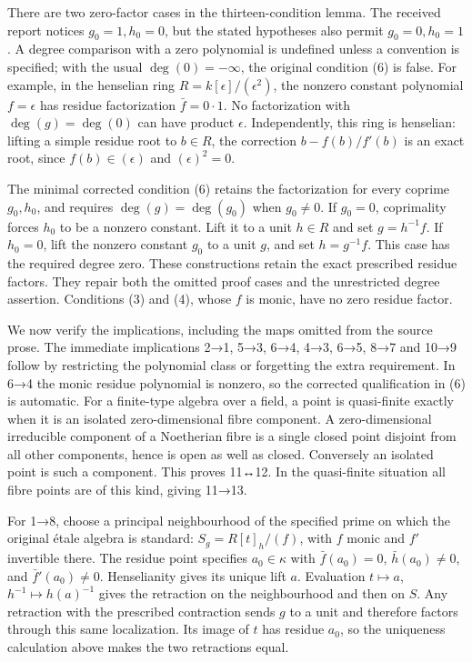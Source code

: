 There are two zero-factor cases in the thirteen-condition lemma. The received report notices \(g_0=1,h_0=0\), but the stated hypotheses also permit \(g_0=0,h_0=1\). A degree comparison with a zero polynomial is undefined unless a convention is specified; with the usual \(\deg(0)=-\infty\), the original condition (6) is false. For example, in the henselian ring \(R=k[\epsilon]/(\epsilon^2)\), the nonzero constant polynomial \(f=\epsilon\) has residue factorization \(\bar f=0\cdot1\). No factorization with \(\deg(g)=\deg(0)\) can have product \(\epsilon\). Independently, this ring is henselian: lifting a simple residue root to \(b\in R\), the correction \(b-f(b)/f'(b)\) is an exact root, since \(f(b)\in(\epsilon)\) and \((\epsilon)^2=0\).

The minimal corrected condition (6) retains the factorization for every coprime \(g_0,h_0\), and requires \(\deg(g)=\deg(g_0)\) when \(g_0\ne0\). If \(g_0=0\), coprimality forces \(h_0\) to be a nonzero constant. Lift it to a unit \(h\in R\) and set \(g=h^{-1}f\). If \(h_0=0\), lift the nonzero constant \(g_0\) to a unit \(g\), and set \(h=g^{-1}f\). This case has the required degree zero. These constructions retain the exact prescribed residue factors. They repair both the omitted proof cases and the unrestricted degree assertion. Conditions (3) and (4), whose \(f\) is monic, have no zero residue factor.

We now verify the implications, including the maps omitted from the source prose. The immediate implications 2→1, 5→3, 6→4, 4→3, 6→5, 8→7 and 10→9 follow by restricting the polynomial class or forgetting the extra requirement. In 6→4 the monic residue polynomial is nonzero, so the corrected qualification in (6) is automatic. For a finite-type algebra over a field, a point is quasi-finite exactly when it is an isolated zero-dimensional fibre component. A zero-dimensional irreducible component of a Noetherian fibre is a single closed point disjoint from all other components, hence is open as well as closed. Conversely an isolated point is such a component. This proves 11↔12. In the quasi-finite situation all fibre points are of this kind, giving 11→13.

For 1→8, choose a principal neighbourhood of the specified prime on which the original étale algebra is standard: \(S_g=R[t]_h/(f)\), with \(f\) monic and \(f'\) invertible there. The residue point specifies \(a_0\in\kappa\) with \(\bar f(a_0)=0\), \(\bar h(a_0)\ne0\), and \(\bar f'(a_0)\ne0\). Henselianity gives its unique lift \(a\). Evaluation \(t\mapsto a\), \(h^{-1}\mapsto h(a)^{-1}\) gives the retraction on the neighbourhood and then on \(S\). Any retraction with the prescribed contraction sends \(g\) to a unit and therefore factors through this same localization. Its image of \(t\) has residue \(a_0\), so the uniqueness calculation above makes the two retractions equal.

